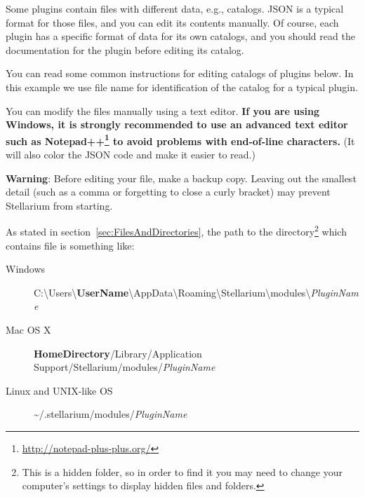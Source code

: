 Some plugins contain files with different data, e.g., catalogs. JSON is a
typical format for those files, and you can edit its contents manually. Of
course, each plugin has a specific format of data for its own catalogs, and
you should read the documentation for the plugin before editing its catalog.

You can read some common instructions for editing catalogs of plugins
below. In this example we use file name  for
identification of the catalog for a typical plugin.

You can modify the  files manually using a text
editor. \textbf{If you are using Windows, it is strongly recommended to
use an advanced text editor such as
Notepad++\footnote{\url{http://notepad-plus-plus.org/}} to avoid problems with
end-of-line characters.} (It will also color the JSON code and make it
easier to read.)

\textbf{Warning}: Before editing your  file, make a
backup copy. Leaving out the smallest detail (such as a comma or
forgetting to close a curly bracket) may prevent Stellarium from
starting.

As stated in section~\ref{sec:FilesAndDirectories}, the path to the
directory\footnote{This is a hidden folder, so in order to find it you
  may need to change your computer's settings to display hidden files
  and folders.} which contains  file is something
like:

\begin{description}
\item[Windows]
  C:\textbackslash Users\textbackslash\textbf{UserName}\textbackslash AppData\textbackslash Roaming\textbackslash Stellarium\textbackslash modules\textbackslash \textit{PluginName}
\item[Mac OS X]
  \textbf{HomeDirectory}/Library/Application Support/Stellarium/modules/\textit{PluginName}
\item[Linux and UNIX-like OS]
  \textasciitilde{}/.stellarium/modules/\textit{PluginName}
\end{description}



